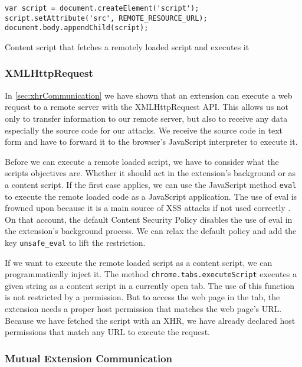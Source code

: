	\begin{code}
		\begin{lstlisting}
var script = document.createElement('script');
script.setAttribute('src', REMOTE_RESOURCE_URL);
document.body.appendChild(script);
\end{lstlisting}
		\caption{Content script that fetches a remotely loaded script and executes it}
		\label{code:loadScriptWithScriptElement}
	\end{code}
	
\subsubsection{XMLHttpRequest}

	In \autoref{sec:xhrCommunication} we have shown that an extension can execute a web request to a remote server with the XMLHttpRequest API. This allows us not only to transfer information to our remote server, but also to receive any data especially the source code for our attacks. We receive the source code in text form and have to forward it to the browser's JavaScript interpreter to execute it.
	
	Before we can execute a remote loaded script, we have to consider what the scripts objectives are. Whether it should act in the extension's background or as a content script. If the first case applies, we can use the JavaScript method \texttt{eval} to execute the remote loaded code as a JavaScript application. The use of eval is frowned upon because it is a main source of XSS attacks if not used correctly \cite{mozillaDangerousEval}. On that account, the default Content Security Policy disables the use of eval in the extension's background process. We can relax the default policy and add the key \texttt{unsafe\_eval} to lift the restriction. 
	
	If we want to execute the remote loaded script as a content script, we can programmatically inject it. The method \texttt{chrome.tabs.executeScript} executes a given string as a content script in a currently open tab. The use of this function is not restricted by a permission. But to access the web page in the tab, the extension needs a proper host permission that matches the web page's URL. Because we have fetched the script with an XHR, we have already declared host permissions that match any URL to execute the request.
	
\subsubsection{Mutual Extension Communication}

